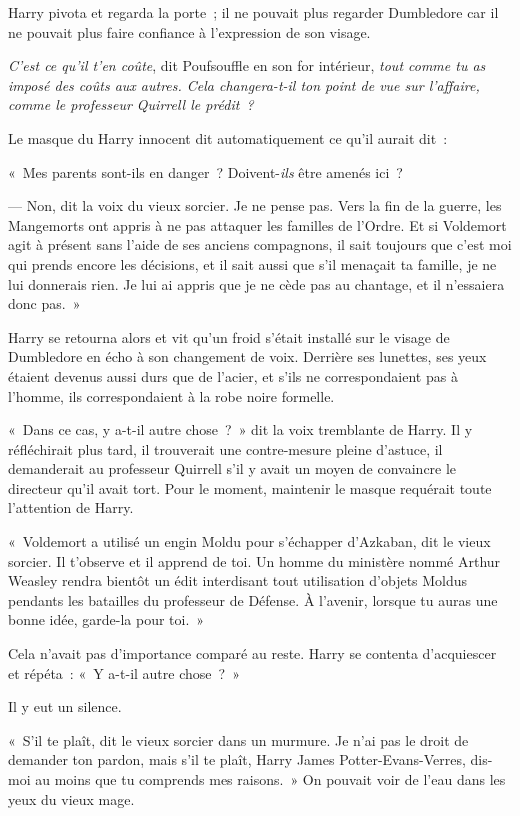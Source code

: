 Harry pivota et regarda la porte~; il ne pouvait plus regarder Dumbledore car il ne pouvait plus faire confiance à l'expression de son visage.

\emph{C'est ce qu'il t'en coûte}, dit Poufsouffle en son for intérieur, \emph{tout comme tu as imposé des coûts aux autres. Cela changera-t-il ton point de vue sur l'affaire, comme le professeur Quirrell le prédit~?}

Le masque du Harry innocent dit automatiquement ce qu'il aurait dit~:

«~Mes parents sont-ils en danger~? Doivent-\emph{ils} être amenés ici~?

--- Non, dit la voix du vieux sorcier. Je ne pense pas. Vers la fin de la guerre, les Mangemorts ont appris à ne pas attaquer les familles de l'Ordre. Et si Voldemort agit à présent sans l'aide de ses anciens compagnons, il sait toujours que c'est moi qui prends encore les décisions, et il sait aussi que s'il menaçait ta famille, je ne lui donnerais rien. Je lui ai appris que je ne cède pas au chantage, et il n'essaiera donc pas.~»

Harry se retourna alors et vit qu'un froid s'était installé sur le visage de Dumbledore en écho à son changement de voix. Derrière ses lunettes, ses yeux étaient devenus aussi durs que de l'acier, et s'ils ne correspondaient pas à l'homme, ils correspondaient à la robe noire formelle.

«~Dans ce cas, y a-t-il autre chose~?~» dit la voix tremblante de Harry. Il y réfléchirait plus tard, il trouverait une contre-mesure pleine d'astuce, il demanderait au professeur Quirrell s'il y avait un moyen de convaincre le directeur qu'il avait tort. Pour le moment, maintenir le masque requérait toute l'attention de Harry.

«~Voldemort a utilisé un engin Moldu pour s'échapper d'Azkaban, dit le vieux sorcier. Il t'observe et il apprend de toi. Un homme du ministère nommé Arthur Weasley rendra bientôt un édit interdisant tout utilisation d'objets Moldus pendants les batailles du professeur de Défense. À l'avenir, lorsque tu auras une bonne idée, garde-la pour toi.~»

Cela n'avait pas d'importance comparé au reste. Harry se contenta d'acquiescer et répéta~: «~Y a-t-il autre chose~?~»

Il y eut un silence.

«~S'il te plaît, dit le vieux sorcier dans un murmure. Je n'ai pas le droit de demander ton pardon, mais s'il te plaît, Harry James Potter-Evans-Verres, dis-moi au moins que tu comprends mes raisons.~» On pouvait voir de l'eau dans les yeux du vieux mage.


